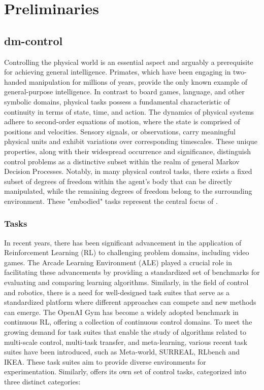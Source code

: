 \newpage
\section{Preliminaries}
\subsection{dm-control\cite{tunyasuvunakool2020}}
Controlling the physical world is an essential aspect and arguably a prerequisite for achieving general intelligence. Primates, which have been engaging in two-handed manipulation for millions of years, provide the only known example of general-purpose intelligence.
In contrast to board games, language, and other symbolic domains, physical tasks possess a fundamental characteristic of continuity in terms of state, time, and action. The dynamics of physical systems adhere to second-order equations of motion, where the state is comprised of positions and velocities. Sensory signals, or observations, carry meaningful physical units and exhibit variations over corresponding timescales. These unique properties, along with their widespread occurrence and significance, distinguish control problems as a distinctive subset within the realm of general Markov Decision Processes. Notably, in many physical control tasks, there exists a fixed subset of degrees of freedom within the agent's body that can be directly manipulated, while the remaining degrees of freedom belong to the surrounding environment. These "embodied" tasks represent the central focus of \dmcontrol.

\subsubsection{Tasks}
In recent years, there has been significant advancement in the application of Reinforcement Learning (RL) to challenging problem domains, including video games. The Arcade Learning Environment (ALE) played a crucial role in facilitating these advancements by providing a standardized set of benchmarks for evaluating and comparing learning algorithms. Similarly, in the field of control and robotics, there is a need for well-designed task suites that serve as a standardized platform where different approaches can compete and new methods can emerge.
The OpenAI Gym has become a widely adopted benchmark in continuous RL, offering a collection of continuous control domains. To meet the growing demand for task suites that enable the study of algorithms related to multi-scale control, multi-task transfer, and meta-learning, various recent task suites have been introduced, such as Meta-world, SURREAL, RLbench and IKEA. These task suites aim to provide diverse environments for experimentation. Similarly, \dmcontrol offers its own set of control tasks, categorized into three distinct categories: 

